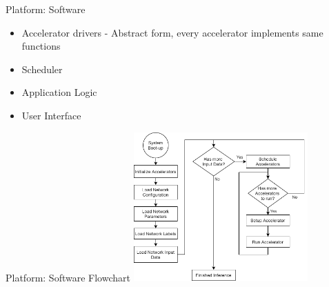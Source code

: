 \begin{frame}{Platform: Software}
	\begin{itemize}
		\item Accelerator drivers - Abstract form, every accelerator implements same functions
		\item Scheduler
		\item Application Logic
		\item User Interface
	\end{itemize}
\end{frame}

\begin{frame}{Platform: Software Flowchart}
	\centering
	\includegraphics[width=0.5\textwidth]{../Images/Platform/PlatformFlowchart.png}\\
\end{frame}

